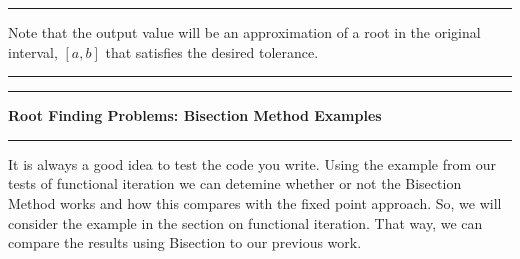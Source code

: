 \documentclass[10pt,fleqn]{article}
\begin{document}
\vskip0.1in\hrule\vskip0.1in
\noindent
Note that the output value will be an approximation of a root in the original
interval, $[a,b]$ that satisfies the desired tolerance.
\vskip0.1in\hrule\vskip0.1in
\newpage
\vskip0.1in\hrule\vskip0.1in
\noindent
{\bf Root Finding Problems: Bisection Method Examples}
\vskip0.1in\hrule\vskip0.1in
\noindent
It is always a good idea to test the code you write. Using the example from our
tests of functional iteration we can detemine whether or not the Bisection 
Method works and how this compares with the fixed point approach. So, we will
consider the example in the section on functional iteration. That way, we can
compare the results using Bisection to our previous work.
\end{document}
